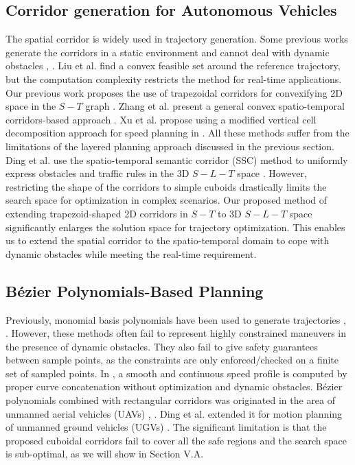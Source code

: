 \documentclass[journal,a4paper,onecolumn,12pt]{IEEEtran}
\begin{document}
\subsection{Corridor generation for Autonomous Vehicles}
The spatial corridor is widely used in trajectory generation. Some previous works generate the corridors in a static environment and cannot deal with dynamic obstacles \cite{zhu_convex_2015}, \cite{erlien_safe_2013}. Liu et al. \cite{liu_convex_2018} find a convex feasible set around the reference trajectory, but the computation complexity restricts the method for real-time applications. Our previous work proposes the use of trapezoidal corridors for convexifying 2D space in the $S-T$ graph \cite{li_motion_nodate}. Zhang et al. present a general convex spatio-temporal corridors-based approach \cite{zhang_sufficient_2022}. Xu et al. propose using a modified vertical cell decomposition approach for speed planning in \cite{xu_speed_nodate}. All these methods suffer from the limitations of the layered planning approach discussed in the previous section. Ding et al. use the spatio-temporal semantic corridor (SSC) method to uniformly express obstacles and traffic rules in the 3D $S-L-T$ space \cite{ding_safe_2019}. However, restricting the shape of the corridors to simple cuboids drastically limits the search space for optimization in complex scenarios. Our proposed method of extending trapezoid-shaped 2D corridors in $S-T$ to 3D $S-L-T$ space significantly enlarges the solution space for trajectory optimization. This enables us to extend the spatial corridor to the spatio-temporal domain to cope with dynamic obstacles while meeting the real-time requirement.

\subsection{B\'{e}zier Polynomials-Based Planning}

Previously, monomial basis polynomials have been used to generate trajectories \cite{werling_optimal_2012}, \cite{fan_baidu_2018}. However, these methods often fail to represent highly constrained maneuvers in the presence of dynamic obstacles. They also fail to give safety guarantees between sample points, as the constraints are only enforced/checked on a finite set of sampled points. In \cite{gonzalez_speed_2016}, a smooth and continuous speed profile is computed by proper curve concatenation without optimization and dynamic obstacles. B\'{e}zier polynomials combined with rectangular corridors was originated in the area of unmanned aerial vehicles (UAVs) \cite{gao_online_2018}, \cite{zhou_robust_2019}. Ding et al. extended it for motion planning of unmanned ground vehicles (UGVs) \cite{ding_safe_2019}. The significant limitation is that the proposed cuboidal corridors fail to cover all the safe regions and the search space is sub-optimal, as we will show in Section V.A.
\end{document}
